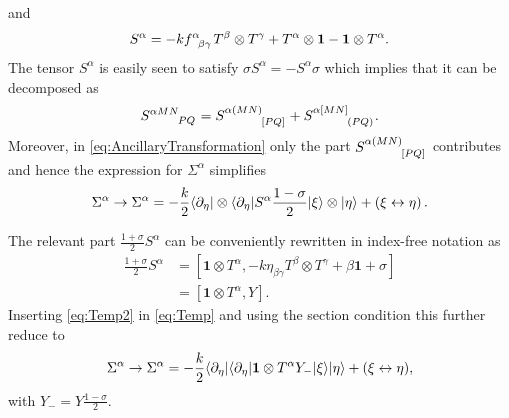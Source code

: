 and 
\begin{equation}\label{eq:STensor}
    S^\alpha = -k\tensor{f}{^{\alpha}_{\beta\gamma}}T^\beta\otimes T^\gamma +T^\alpha\otimes \mathbf{1}-\mathbf{1}\otimes T^\alpha. 
\end{equation}
The tensor $S^\alpha$ is easily seen to satisfy $\sigma S^\alpha = -S^\alpha\sigma$ which implies that it can be decomposed as 
\begin{equation}
    \tensor{S}{^{\alpha MN}_{PQ}} = \tensor{S}{^{\alpha (MN)}_{[PQ]}}+\tensor{S}{^{\alpha [MN]}_{(PQ)}}. 
\end{equation}
Moreover, in \eqref{eq:AncillaryTransformation} only the part $\tensor{S}{^{\alpha (MN)}_{[PQ]}}$ contributes and hence the expression for $\Sigma^\alpha$ simplifies
\begin{equation}\label{eq:Temp}
    \Sigma^\alpha\to \Sigma^\alpha = -\frac{k}{2}\langle \partial_\eta|\otimes\langle \partial_\eta| S^\alpha\frac{1-\sigma}{2}|\xi\rangle \otimes |\eta\rangle + \left(\xi\leftrightarrow\eta\right).
\end{equation}

The relevant part $\frac{1+\sigma}{2}S^\alpha$ can be conveniently rewritten in index-free notation as
\begin{equation}\label{eq:Temp2}
    \begin{aligned}
        \frac{1+\sigma}{2}S^\alpha &= [\mathbf{1}\otimes T^\alpha,-k\eta_{\beta\gamma}T^\beta\otimes T^\gamma+\beta\mathbf{1}+\sigma]\\
        &= [\mathbf{1}\otimes T^\alpha,Y].
    \end{aligned}
\end{equation}
Inserting \eqref{eq:Temp2} in \eqref{eq:Temp} and using the section condition this further reduce to 
\begin{equation}
    \Sigma^\alpha \to \Sigma^\alpha = -\frac{k}{2}\langle\partial_\eta|\langle\partial_\eta |\mathbf{1}\otimes T^\alpha Y_-|\xi\rangle|\eta\rangle+(\xi\leftrightarrow\eta),
\end{equation}
with $Y_- = Y\frac{1-\sigma}{2}$. 


